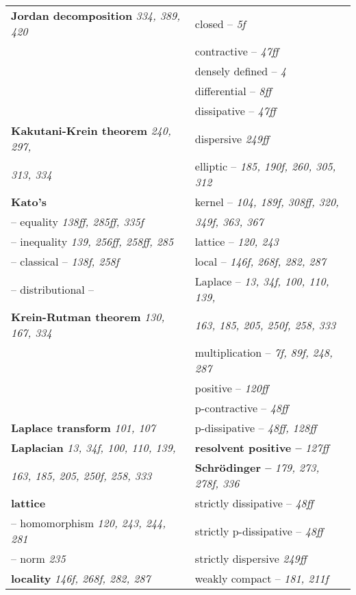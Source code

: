 \begin{longtable}{p{}p{}}
\textbf{Jordan decomposition} \textit{334, 389, 420} & \quad closed -- \textit{5f} \\
& \quad contractive -- \textit{47ff} \\
& \quad densely defined -- \textit{4} \\
& \quad differential -- \textit{8ff} \\
& \quad dissipative -- \textit{47ff} \\
\textbf{Kakutani-Krein theorem} \textit{240, 297,} & \quad dispersive \textit{249ff} \\
\quad \textit{313, 334} & \quad elliptic -- \textit{185, 190f, 260, 305, 312} \\
\textbf{Kato's} & \quad kernel -- \textit{104, 189f, 308ff, 320,} \\
\quad -- equality \textit{138ff, 285ff, 335f} & \quad\quad \textit{349f, 363, 367} \\
\quad -- inequality \textit{139, 256ff, 258ff, 285} & \quad lattice -- \textit{120, 243} \\
\quad -- classical -- \textit{138f, 258f} & \quad local -- \textit{146f, 268f, 282, 287} \\
\quad -- distributional -- & \quad Laplace -- \textit{13, 34f, 100, 110, 139,} \\
\textbf{Krein-Rutman theorem} \textit{130, 167, 334} & \quad\quad \textit{163, 185, 205, 250f, 258, 333} \\
& \quad multiplication -- \textit{7f, 89f, 248, 287} \\
& \quad positive -- \textit{120ff} \\
& \quad p-contractive -- \textit{48ff} \\
\textbf{Laplace transform} \textit{101, 107} & \quad p-dissipative -- \textit{48ff, 128ff} \\
\textbf{Laplacian} \textit{13, 34f, 100, 110, 139,} & \textbf{resolvent positive --} \textit{127ff} \\
\quad \textit{163, 185, 205, 250f, 258, 333} & \textbf{Schrödinger --} \textit{179, 273, 278f, 336} \\
\textbf{lattice} & \quad strictly dissipative -- \textit{48ff} \\
\quad -- homomorphism \textit{120, 243, 244, 281} & \quad strictly p-dissipative -- \textit{48ff} \\
\quad -- norm \textit{235} & \quad strictly dispersive \textit{249ff} \\
\textbf{locality} \textit{146f, 268f, 282, 287} & \quad weakly compact -- \textit{181, 211f} \\

\end{longtable}
